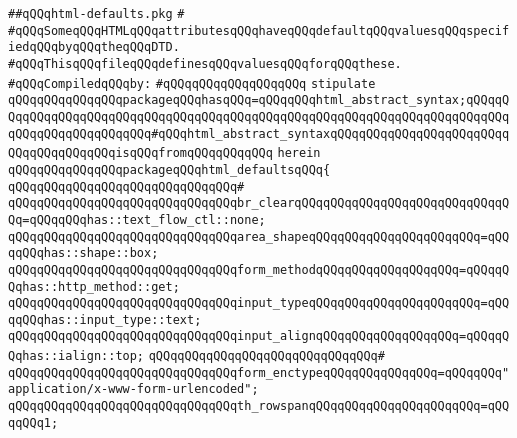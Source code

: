 \label{src/lib/html/html-defaults.pkg}
\verb|##qQQqhtml-defaults.pkg|\newline
\verb|#|\newline
\verb|#qQQqSomeqQQqHTMLqQQqattributesqQQqhaveqQQqdefaultqQQqvaluesqQQqspecifiedqQQqbyqQQqtheqQQqDTD.|\newline
\verb|#qQQqThisqQQqfileqQQqdefinesqQQqvaluesqQQqforqQQqthese.|\newline
\newline
\verb|#qQQqCompiledqQQqby:|\newline
\verb|#qQQqqQQqqQQqqQQqqQQq|\newline
\newline
\verb|stipulate|\newline
\verb|qQQqqQQqqQQqqQQqpackageqQQqhasqQQq=qQQqqQQqhtml_abstract_syntax;qQQqqQQqqQQqqQQqqQQqqQQqqQQqqQQqqQQqqQQqqQQqqQQqqQQqqQQqqQQqqQQqqQQqqQQqqQQqqQQqqQQqqQQqqQQqqQQq#qQQqhtml_abstract_syntaxqQQqqQQqqQQqqQQqqQQqqQQqqQQqqQQqqQQqqQQqisqQQqfromqQQqqQQqqQQq|\newline
\verb|herein|\newline
\newline
\verb|qQQqqQQqqQQqqQQqpackageqQQqhtml_defaultsqQQq{|\newline
\verb|qQQqqQQqqQQqqQQqqQQqqQQqqQQqqQQq#|\newline
\verb|qQQqqQQqqQQqqQQqqQQqqQQqqQQqqQQqbr_clearqQQqqQQqqQQqqQQqqQQqqQQqqQQqqQQq=qQQqqQQqhas::text_flow_ctl::none;|\newline
\verb|qQQqqQQqqQQqqQQqqQQqqQQqqQQqqQQqarea_shapeqQQqqQQqqQQqqQQqqQQqqQQq=qQQqqQQqhas::shape::box;|\newline
\verb|qQQqqQQqqQQqqQQqqQQqqQQqqQQqqQQqform_methodqQQqqQQqqQQqqQQqqQQq=qQQqqQQqhas::http_method::get;|\newline
\verb|qQQqqQQqqQQqqQQqqQQqqQQqqQQqqQQqinput_typeqQQqqQQqqQQqqQQqqQQqqQQq=qQQqqQQqhas::input_type::text;|\newline
\verb|qQQqqQQqqQQqqQQqqQQqqQQqqQQqqQQqinput_alignqQQqqQQqqQQqqQQqqQQq=qQQqqQQqhas::ialign::top;|\newline
\verb|qQQqqQQqqQQqqQQqqQQqqQQqqQQqqQQq#|\newline
\verb|qQQqqQQqqQQqqQQqqQQqqQQqqQQqqQQqform_enctypeqQQqqQQqqQQqqQQq=qQQqqQQq"application/x-www-form-urlencoded";|\newline
\verb|qQQqqQQqqQQqqQQqqQQqqQQqqQQqqQQqth_rowspanqQQqqQQqqQQqqQQqqQQqqQQq=qQQqqQQq1;|\newline
